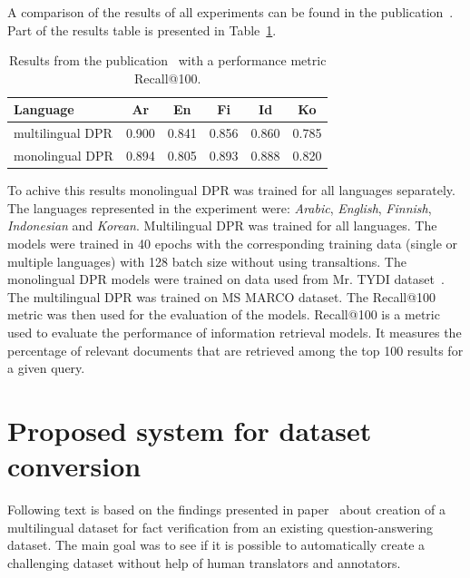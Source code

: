 A comparison of the results of all experiments can be found in the publication~\cite{mDPR_training}. Part of the results table is presented in Table~\ref{tab:mdpr_results}.

\begin{table}[h]
    \centering
    \begin{tabular}{l|ccccc}
        \hline
        Language & Ar & En & Fi & Id & Ko \\
        \hline
        multilingual DPR &  0.900 & 0.841 & 0.856 & 0.860 & 0.785 \\
        monolingual DPR & 0.894 & 0.805 & 0.893 & 0.888 & 0.820 \\
        \hline
    \end{tabular}
    \caption{Results from the publication~\cite{mDPR_training} with a performance metric Recall@100.}
    \label{tab:mdpr_results}
\end{table}

To achive this results monolingual DPR was trained for all languages separately. The languages represented in the experiment were: \emph{Arabic}, \emph{English}, \emph{Finnish}, \emph{Indonesian} and \emph{Korean}. Multilingual DPR was trained for all languages. The models were trained in 40 epochs with the corresponding training data (single or multiple languages) with 128 batch size without using transaltions. The monolingual DPR models were trained on data used from Mr. TYDI dataset~\cite{mrtydi}. The multilingual DPR was trained on MS MARCO dataset. The Recall@100 metric was then used for the evaluation of the models. Recall@100 is a metric used to evaluate the performance of information retrieval models. It measures the percentage of relevant documents that are retrieved among the top 100 results for a given query.


\chapter{Proposed system for dataset conversion}\label{c5}
Following text is based on the findings presented in paper~\cite{faviq} about creation of a multilingual dataset for fact verification from an existing question-answering dataset. The main goal was to see if it is possible to automatically create a challenging dataset without help of human translators and annotators.

